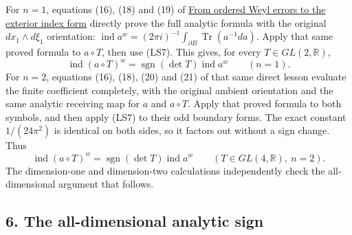 \documentclass[
  11pt,
]{article}
\begin{document}
For \(n=1\), equations (16), (18) and (19) of
\href{ordered-weyl-exterior-reduction.pdf}{From ordered Weyl errors to
the exterior index form} directly prove the full analytic formula with
the original \(dx_1\wedge d\xi_1\) orientation:
\(\operatorname{ind}a^w=(2\pi i)^{-1}
\int_{\partial B}\operatorname{Tr}(a^{-1}da)\). Apply that same proved
formula to \(a\circ T\), then use (LS7). This gives, for every
\(T\in GL(2,\mathbb R)\), \[
 \operatorname{ind}(a\circ T)^w
   =\operatorname{sgn}(\det T)\operatorname{ind}a^w
       \qquad(n=1).
 \tag{LS8}
\] For \(n=2\), equations (16), (18), (20) and (21) of that same direct
lesson evaluate the finite coefficient completely, with the original
ambient orientation and the same analytic receiving map for \(a\) and
\(a\circ T\). Apply that proved formula to both symbols, and then apply
(LS7) to their odd boundary forms. The exact constant \(1/(24\pi^2)\) is
identical on both sides, so it factors out without a sign change. Thus
\[
 \operatorname{ind}(a\circ T)^w
    =\operatorname{sgn}(\det T)\operatorname{ind}a^w
       \qquad(T\in GL(4,\mathbb R),\ n=2).
 \tag{LS9}
\] The dimension-one and dimension-two calculations independently check
the all-dimensional argument that follows.

\subsection{6. The all-dimensional analytic
sign}\label{the-all-dimensional-analytic-sign}
\end{document}
